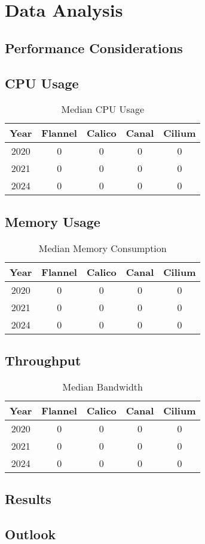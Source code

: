 %
%

\pagebreak
\section{Data Analysis}

\onehalfspacing

\subsection{Performance Considerations}

\subsection{CPU Usage}

\begin{table}[h!]
\caption{Median CPU Usage}
\begin{tabular}{||c | c | c | c | c||} 
 \hline
 Year & Flannel & Calico & Canal & Cilium \\
 \hline\hline
 2020 & 0 & 0 & 0 & 0 \\ 
 \hline
 2021 & 0 & 0 & 0 & 0 \\
 \hline
 2024 & 0 & 0 & 0 & 0 \\
 \hline
\end{tabular}
\label{tab:cpu}
\end{table}

\subsection{Memory Usage}

\begin{table}[h!]
\caption{Median Memory Consumption}
\begin{tabular}{||c | c | c | c | c||} 
 \hline
 Year & Flannel & Calico & Canal & Cilium \\
 \hline\hline
 2020 & 0 & 0 & 0 & 0 \\ 
 \hline
 2021 & 0 & 0 & 0 & 0 \\
 \hline
 2024 & 0 & 0 & 0 & 0 \\
 \hline
\end{tabular}
\label{tab:mem}
\end{table}

\subsection{Throughput}

\begin{table}[h!]
\caption{Median Bandwidth}
\begin{tabular}{||c | c | c | c | c||} 
 \hline
 Year & Flannel & Calico & Canal & Cilium \\
 \hline\hline
 2020 & 0 & 0 & 0 & 0 \\ 
 \hline
 2021 & 0 & 0 & 0 & 0 \\
 \hline
 2024 & 0 & 0 & 0 & 0 \\
 \hline
\end{tabular}
\label{tab:bw}
\end{table}

\subsection{Results}

\subsection{Outlook}
